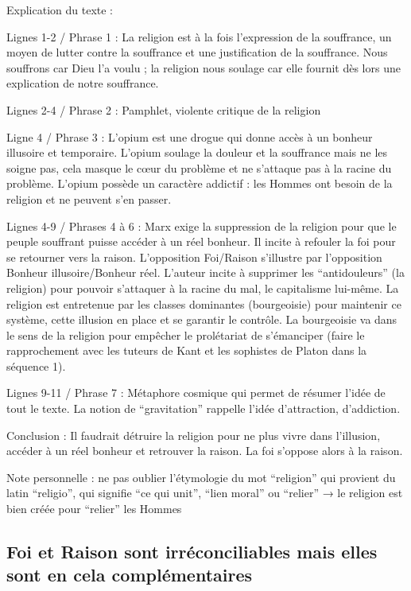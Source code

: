 \documentclass[french]{book}
\theoremstyle{definition}
\begin{document}
Explication du texte :

Lignes 1-2 / Phrase 1 : La religion est à la fois l’expression de la souffrance, un moyen de lutter contre la souffrance et une justification de la souffrance. Nous souffrons car Dieu l’a voulu ; la religion nous soulage car elle fournit dès lors une explication de notre souffrance.

Lignes 2-4 / Phrase 2 : Pamphlet, violente critique de la religion

Ligne 4 / Phrase 3 : L’opium est une drogue qui donne accès à un bonheur illusoire et temporaire. L’opium soulage la douleur et la souffrance mais ne les soigne pas, cela masque le cœur du problème et ne s'attaque pas à la racine du problème. L’opium possède un caractère addictif : les Hommes ont besoin de la religion et ne peuvent s’en passer.

Lignes 4-9 / Phrases 4 à 6 : Marx exige la suppression de la religion pour que le peuple souffrant puisse accéder à un réel bonheur. Il incite à refouler la foi pour se retourner vers la raison. L’opposition Foi/Raison s’illustre par l’opposition Bonheur illusoire/Bonheur réel. L’auteur incite à supprimer les “antidouleurs” (la religion) pour pouvoir s'attaquer à la racine du mal, le capitalisme lui-même. La religion est entretenue par les classes dominantes (bourgeoisie) pour maintenir ce système, cette illusion en place et se garantir le contrôle. La bourgeoisie va dans le sens de la religion pour empêcher le prolétariat de s’émanciper (faire le rapprochement avec les tuteurs de Kant et les sophistes de Platon dans la séquence 1).

Lignes 9-11 / Phrase 7  : Métaphore cosmique qui permet de résumer l’idée de tout le texte. La notion de “gravitation” rappelle l’idée d’attraction, d’addiction.

Conclusion : Il faudrait détruire la religion pour ne plus vivre dans l’illusion, accéder à un réel bonheur et retrouver la raison. La foi s’oppose alors à la raison.

Note personnelle : ne pas oublier l’étymologie du mot “religion” qui provient du latin “religio”, qui signifie “ce qui unit”, “lien moral” ou “relier” → le religion est bien créée pour “relier” les Hommes

\subsection{Foi et Raison sont irréconciliables mais elles sont en cela complémentaires}
\end{document}
